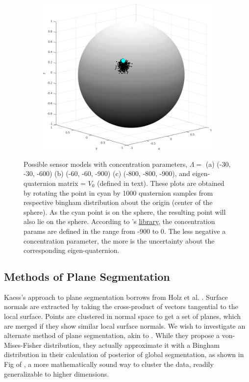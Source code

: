 \documentclass[12pt]{article}
\begin{document}
\begin{figure}[H]
\begin{subfigure}{.3\textwidth}
\end{subfigure}
%
\begin{subfigure}{.3\textwidth}
  \centering
    \includegraphics[width=\linewidth]{sensor_model_800_800_900}
\end{subfigure}
\caption{Possible sensor models with concentration parameters, $\Lambda=$ (a) (-30, -30, -600) (b) (-60, -60, -900) (c) (-800, -800, -900), and eigen-quaternion matrix = $V_0$ (defined in text). 
These plots are obtained by rotating the point in cyan by 1000 quaternion samples from respective bingham distribution about the origin (center of the sphere). 
As the cyan point is on the sphere, the resulting point will also lie on the sphere.
According to \cite{glover2013tracking}'s \href{https://github.com/SebastianRiedel/bingham}{library}, the concentration params are defined in the range from -900 to 0.  
The less negative a concentration parameter, the more is the uncertainty about the corresponding eigen-quaternion. }
\label{fig:sensor_model}
\end{figure}


\subsection*{Methods of Plane Segmentation}

Kaess's approach to plane segmentation borrows from Holz et al. \cite{holz2011real}. 
Surface normals are extracted by taking the cross-product of vectors tangential to the local surface. 
Points are clustered in normal space to get a set of planes, which are merged if they show similar local surface normals. 
We wish to investigate an alternate method of plane segmentation, akin to \cite{straub2015dirichlet}. 
While they propose a von-Mises-Fisher distribution, they actually approximate it with a Bingham distribution in their calculation of posterior of global segmentation, as shown in Fig of \cite{straub2014mixture}, a more mathematically sound way to cluster the data, readily generalizable to higher dimensions. 
\end{document}
